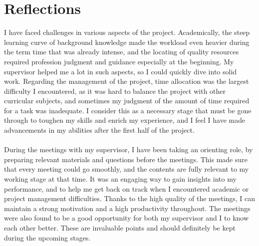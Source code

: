 \section{Reflections}
I have faced challenges in various aspects of the project. Academically, the steep learning curve of background knowledge made the workload even heavier during the term time that was already intense, and the locating of quality resources required profession judgment and guidance especially at the beginning. My supervisor helped me a lot in such aspects, so I could quickly dive into solid work. Regarding the management of the project, time allocation was the largest difficulty I encountered, as it was hard to balance the project with other curricular subjects, and sometimes my judgment of the amount of time required for a task was inadequate. I consider this as a necessary stage that must be gone through to toughen my skills and enrich my experience, and I feel I have made advancements in my abilities after the first half of the project.
\\\\
During the meetings with my supervisor, I have been taking an orienting role, by preparing relevant materials and questions before the meetings. This made sure that every meeting could go smoothly, and the contents are fully relevant to my working stage at that time. It was an engaging way to gain insights into my performance, and to help me get back on track when I encountered academic or project management difficulties. Thanks to the high quality of the meetings, I can maintain a strong motivation and a high productivity throughout. The meetings were also found to be a good opportunity for both my supervisor and I to know each other better. These are invaluable points and should definitely be kept during the upcoming stages.
